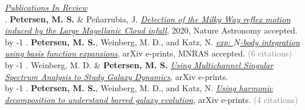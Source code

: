 \underline{\sl Publications In Review} \\
\the\PublicationsInReview.  {\bf \textcolor{blueshade}{Petersen, M. S.}} \& Pe{\~n}arrubia, J.  \href{https://michael-petersen.github.io}{\it Detection of the Milky Way reflex motion induced by the Large Magellanic Cloud infall}, 2020, Nature Astronomy accepted.\\
\advance\PublicationsInReview by -1\relax
\the\PublicationsInReview.  {\bf \textcolor{blueshade}{Petersen, M. S.}}, Weinberg, M. D., and Katz, N. \href{https://ui.adsabs.harvard.edu/abs/2019arXiv190205081P/abstract}{\it {\sc exp}: $N$-body integration using basis function expansions}, arXiv e-prints, MNRAS accepted. \ifcitationnumbers \textcolor{grey}{(6 citations)} \fi\\
\advance\PublicationsInReview by -1\relax
\the\PublicationsInReview.  Weinberg, M. D. \& {\bf \textcolor{blueshade}{Petersen, M. S.}} \href{https://arxiv.org/abs/2009.07870}{\it Using Multichannel Singular Spectrum Analysis to Study
  Galaxy Dynamics}, arXiv e-prints. \\
\advance\PublicationsInReview by -1\relax
\the\PublicationsInReview.  {\bf \textcolor{blueshade}{Petersen, M. S.}}, Weinberg, M. D., and Katz, N. \href{https://ui.adsabs.harvard.edu/abs/2019arXiv190308203P/abstract}{\it Using harmonic decomposition to understand barred galaxy evolution}, arXiv e-prints. \ifcitationnumbers \textcolor{grey}{(4 citations)} \fi\\




